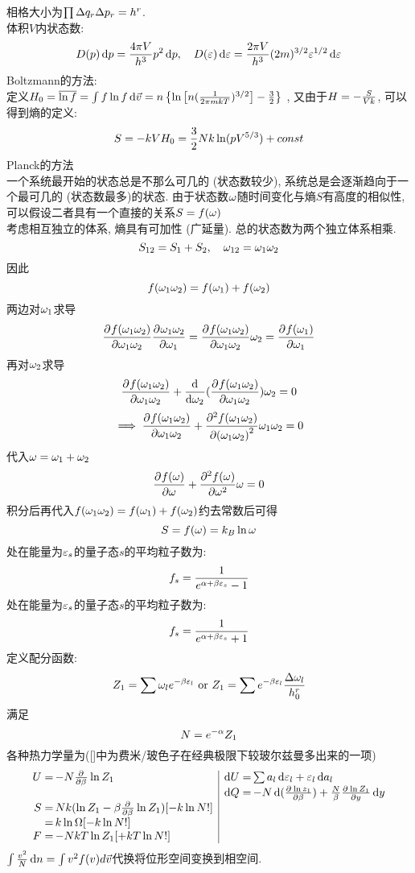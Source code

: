 \documentclass[UTF8,9pt]{ctexart}
\begin{document}
相格大小为$\prod \D q_r\D p_r=h^r$.\\
体积$V$内状态数:
$$D(p)\d p=\f{4\pi V}{h^3}p^2 \d p, \quad D(\ep)\d\ep = \f{2\pi V}{h^3}(2m)^{3/2}\ep^{1/2}\d\ep$$
    Boltzmann的方法: \\
    定义$H_0=\bar{\ln f}=\int f\ln f\d\vec v= n\left\{\ln\left[n(\ff{2\pi mkT})^{3/2}\right]-\f{3}{2}\right\}$ , 又由于$H=-\f{S}{Vk}$, 可以得到熵的定义: 
    $$S=-kVH_0=\f{3}{2}Nk\ln (pV^{5/3})+const$$
    Planck的方法\\
    一个系统最开始的状态总是不那么可几的 (状态数较少), 系统总是会逐渐趋向于一个最可几的 (状态数最多)的状态. 由于状态数$\o$随时间变化与熵$S$有高度的相似性, 可以假设二者具有一个直接的关系$S=f(\o)$\\
    考虑相互独立的体系, 熵具有可加性 (广延量). 总的状态数为两个独立体系相乘. 
    $$S_{12}=S_1+S_2,\quad \o_{12}=\o_1\o_2$$
    因此
    $$f(\o_1\o_2)=f(\o_1)+f(\o_2)$$
    两边对$\o_1$求导
    $$\pp{f(\o_1\o_2)}{\o_1\o_2}\pp{\o_1\o_2}{\o_1}=\pp{f(\o_1\o_2)}{\o_1\o_2}\o_2=\pp{f(\o_1)}{\o_1}$$
    再对$\o_2$求导
    $$\pp{f(\o_1\o_2)}{\o_1\o_2}+\dd{}{\o_2}(\pp{f(\o_1\o_2)}{\o_1\o_2})\o_2=0$$
    $$\ip \pp{f(\o_1\o_2)}{\o_1\o_2}+\pp[2]{f(\o_1\o_2)}{(\o_1\o_2)}\o_1\o_2=0$$
    代入$\o=\o_1+\o_2$
    $$\pp{f(\o)}{\o}+\pp[2]{f(\o)}{\o}\o=0$$
    积分后再代入$f(\o_1\o_2)=f(\o_1)+f(\o_2)$约去常数后可得
    $$S=f(\o)=k_B\ln \o$$
处在能量为$\ep_s$的量子态$s$的平均粒子数为:
$$f_s=\ff{e^{\a+\b\ep_s}-1}$$
处在能量为$\ep_s$的量子态$s$的平均粒子数为:
$$f_s=\ff{e^{\a+\b\ep_s}+1}$$
定义配分函数:
$$Z_1=\sum \o_le^{-\b\ep_l}\text{  or  }Z_1=\sum e^{-\b\ep_l}\f{\D \o_l}{h_0^r}$$
满足$$N=e^{-\a}Z_1$$
各种热力学量为([]中为费米/玻色子在经典极限下较玻尔兹曼多出来的一项)
$$\begin{array}{rl|rl}
    U \x -N \pp{}{\b}\ln Z_1      &        \d U \x \sum a_l\d \ep_l+\ep_l\d a_l                        \\
      &   &                                 \d Q \x -N\d(\pp{\ln z_1}{\b})+\f{N}{\b}\pp{\ln Z_1}{y}\d y \\
    S \x Nk(\ln Z_1-\b\pp{}{\b}\ln Z_1)[-k\ln N!] &      &                                                       \\
    \x k\ln\O[-k\ln N!]\\
    F \x -NkT\ln Z_1[+kT\ln N!]                    &      &                                                       
    \end{array}$$
    $\int \f{v^2}{N}\d n=\int v^2f(v)d\vec{v}$代换将位形空间变换到相空间. \\
\end{document}
